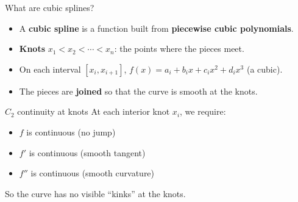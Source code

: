 \documentclass[aspectratio=169]{beamer}
\begin{document}
\begin{frame}{What are cubic splines?}
\begin{itemize}
    \item A \textbf{cubic spline} is a function built from \textbf{piecewise cubic polynomials}.
    \item \textbf{Knots} $x_1 < x_2 < \cdots < x_n$: the points where the pieces meet.
    \item On each interval $[x_i, x_{i+1}]$, $f(x) = a_i + b_i x + c_i x^2 + d_i x^3$ (a cubic).
    \item The pieces are \textbf{joined} so that the curve is smooth at the knots.
\end{itemize}

\begin{block}{$C_2$ continuity at knots}
At each interior knot $x_i$, we require:
\begin{itemize}
    \item $f$ is continuous (no jump)
    \item $f'$ is continuous (smooth tangent)
    \item $f''$ is continuous (smooth curvature)
\end{itemize}
So the curve has no visible ``kinks'' at the knots.
\end{block}
\end{frame}
\end{document}
